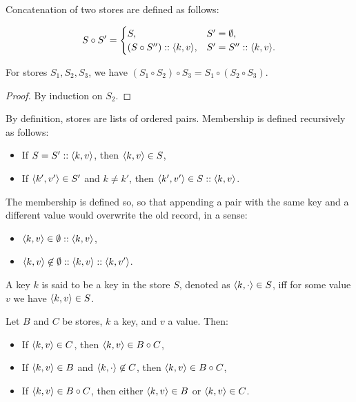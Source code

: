 \begin{definition}
Concatenation of two stores are defined as follows:

\begin{equation*}
S \circ S' =
\begin{cases}
    S, & S' = \emptyset, \\
    (S \circ S'') :: \langle k, v \rangle, & S' = S'' :: \langle k, v \rangle.
\end{cases}
\end{equation*}
\end{definition}

\begin{lemma}[Associativity]
For stores $S_1, S_2, S_3$, we have $(S_1 \circ S_2) \circ S_3 = S_1 \circ (S_2 \circ S_3)$.
\end{lemma}
\begin{proof}
By induction on $S_2$.
\end{proof}

\begin{definition}[Membership]
\label{defn:generic-context-membership}
By definition, stores are lists of ordered pairs. Membership is defined recursively as follows:
\begin{itemize}
    \item If $S = S' :: \langle k, v \rangle$, then $\langle k, v \rangle \in S$,
    \item If $\langle k', v' \rangle \in S'$ and $k \not= k'$, then $\langle k', v' \rangle \in S :: \langle k, v \rangle$. \qedhere
\end{itemize}
\end{definition}

The membership is defined so, so that appending a pair with the same key and a different value would overwrite the old record, in a sense:
\begin{itemize}
    \item $\langle k, v \rangle \in \emptyset :: \langle k, v \rangle$,
    \item $\langle k, v \rangle \not\in \emptyset :: \langle k, v \rangle :: \left\langle k, v' \right\rangle$.
\end{itemize}

\begin{definition}
A key $k$ is said to be a key in the store $S$, denoted as $\left\langle k, \cdot \right\rangle \in S$, iff for some value $v$ we have $\langle k, v \rangle \in S$.
\end{definition}

\begin{lemma}
Let $B$ and $C$ be stores, $k$ a key, and $v$ a value. Then:
\begin{itemize}
    \item If $\langle k, v \rangle \in C$, then $\langle k, v \rangle \in B \circ C$,
    \item If $\langle k, v \rangle \in B$ and $\left\langle k, \cdot \right\rangle \not\in C$, then $\langle k, v \rangle \in B \circ C$,
    \item If $\langle k, v \rangle \in B \circ C$, then either $\langle k, v \rangle \in B$ or $\langle k, v \rangle \in C$.
\end{itemize}
\end{lemma}

